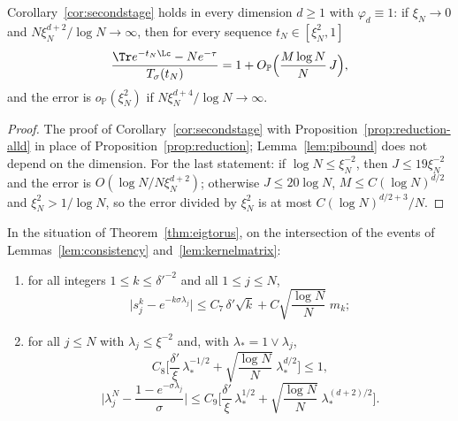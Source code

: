 \begin{corollary}\label{cor:secondstage-alld}
Corollary~\ref{cor:secondstage} holds in every dimension $d\ge1$ with $\varphi_d\equiv1$: if $\xi_N\to0$
and $N\xi_N^{d+2}/\log N\to\infty$, then for every sequence $t_N\in[\xi_N^2,1]$
\[
 \frac{\Tr e^{-t_N\Lc}-Ne^{-\tau}}{T_\sigma(t_N)}=1+O_{\mathbb P}\Big(\frac{M\log N}{N}\,J\Big),
\]
and the error is $o_{\mathbb P}(\xi_N^2)$ if $N\xi_N^{d+4}/\log N\to\infty$.
\end{corollary}

\begin{proof}
The proof of Corollary~\ref{cor:secondstage} with Proposition~\ref{prop:reduction-alld} in place of
Proposition~\ref{prop:reduction}; Lemma~\ref{lem:pibound} does not depend on the dimension. For the last
statement: if $\log N\le\xi_N^{-2}$, then $J\le19\xi_N^{-2}$ and the error is $O(\log N/N\xi_N^{d+2})$;
otherwise $J\le20\log N$, $M\le C(\log N)^{d/2}$ and $\xi_N^2>1/\log N$, so the error divided by $\xi_N^2$ is
at most $C(\log N)^{d/2+3}/N$.
\end{proof}

\begin{theorem}\label{thm:eigtorus-l1}
In the situation of Theorem~\ref{thm:eigtorus}, on the intersection of the events of
Lemmas~\ref{lem:consistency} and~\ref{lem:kernelmatrix}:
\begin{enumerate}
\item[(i)] for all integers $1\le k\le\delta'^{-2}$ and all $1\le j\le N$,
\[
 \big|s_j^k-e^{-k\sigma\lambda_j}\big|\le C_7\,\delta'\sqrt k+C\sqrt{\frac{\log N}N}\;m_k ;
\]
\item[(ii)] for all $j\le N$ with $\lambda_j\le\xi^{-2}$ and, with $\lambda_*=1\vee\lambda_j$,
\begin{equation}\label{eq:l1-cond}
 C_8\Big[\frac{\delta'}\xi\,\lambda_*^{-1/2}+\sqrt{\frac{\log N}N}\;\lambda_*^{d/2}\Big]\le1,
\end{equation}
\[
 \Big|\lambda^N_j-\frac{1-e^{-\sigma\lambda_j}}{\sigma}\Big|\le C_9\Big[\frac{\delta'}\xi\,\lambda_*^{1/2}
 +\sqrt{\frac{\log N}N}\;\lambda_*^{(d+2)/2}\Big].
\]
\end{enumerate}
\end{theorem}

